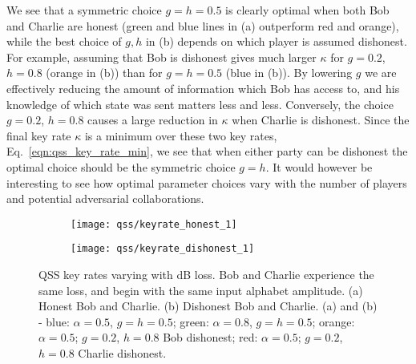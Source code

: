 We see that a symmetric choice $g = h = 0.5$ is clearly optimal when both Bob and Charlie are honest (green and blue lines in (a) outperform red and orange), while the best choice of $g, h$ in (b) depends on which player is assumed dishonest. For example, assuming that Bob is dishonest gives much larger $\kappa$ for $g=0.2$, $h=0.8$ (orange in (b)) than for $g = h = 0.5$ (blue in (b)). By lowering $g$ we are effectively reducing the amount of information which Bob has access to, and his knowledge of which state was sent matters less and less. Conversely, the choice $g=0.2$, $h=0.8$ causes a large reduction in $\kappa$ when Charlie is dishonest. Since the final key rate $\kappa$ is a minimum over these two key rates, Eq.~\ref{eqn:qss_key_rate_min}, we see that when either party can be dishonest the optimal choice should be the symmetric choice $g=h$. It would however be interesting to see how optimal parameter choices vary with the number of players and potential adversarial collaborations.



\begin{figure}[htp]
\captionsetup{width=0.8\linewidth}
\centering
	\begin{subfigure}{0.7\linewidth}
	\centering
	\texttt{[image: qss/keyrate\_honest\_1]}
	\caption{}
	\end{subfigure}
	\begin{subfigure}{0.7\linewidth}
	\centering
	\texttt{[image: qss/keyrate\_dishonest\_1]}
	\caption{}
	\end{subfigure}
\caption{\label{fig:qss_keyrate} QSS key rates varying with dB loss. Bob and Charlie experience the same loss, and begin with the same input alphabet amplitude. (a) Honest Bob and Charlie. (b) Dishonest Bob and Charlie. (a) and (b) - blue: $\alpha=0.5$, $g=h=0.5$; green: $\alpha = 0.8$, $g = h = 0.5$; orange: $\alpha = 0.5$; $g = 0.2$, $h=0.8$ Bob dishonest; red: $\alpha = 0.5$; $g=0.2$, $h=0.8$ Charlie dishonest.}
\end{figure}



